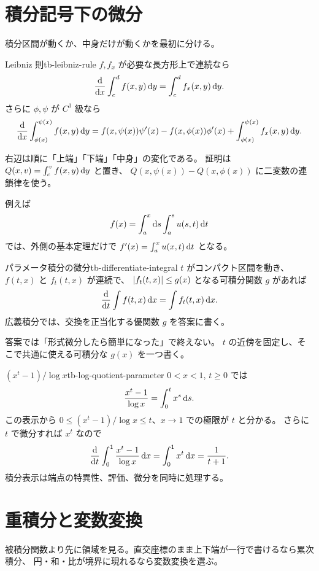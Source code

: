 \section{積分記号下の微分}

積分区間が動くか、中身だけが動くかを最初に分ける。

\begin{theorem}{Leibniz 則}{tb-leibniz-rule}
$f,f_x$ が必要な長方形上で連続なら
\[
\frac{\mathrm{d}}{\mathrm{d} x}\int_c^d f(x,y)\,\mathrm{d} y
=\int_c^d f_x(x,y)\,\mathrm{d} y.
\]
さらに $\phi,\psi$ が $C^1$ 級なら
\[
\frac{\mathrm{d}}{\mathrm{d} x}\int_{\phi(x)}^{\psi(x)}f(x,y)\,\mathrm{d} y
=f(x,\psi(x))\psi'(x)-f(x,\phi(x))\phi'(x)
+\int_{\phi(x)}^{\psi(x)}f_x(x,y)\,\mathrm{d} y.
\]
\end{theorem}

右辺は順に「上端」「下端」「中身」の変化である。
証明は $Q(x,v)=\int_c^v f(x,y)\,\mathrm{d} y$ と置き、
$Q(x,\psi(x))-Q(x,\phi(x))$ に二変数の連鎖律を使う。

例えば
\[
f(x)=\int_a^x\mathrm{d} s\int_a^s u(s,t)\,\mathrm{d} t
\]
では、外側の基本定理だけで
$f'(x)=\int_a^xu(x,t)\,\mathrm{d} t$ となる。

\begin{theorem}{パラメータ積分の微分}{tb-differentiate-integral}
$t$ がコンパクト区間を動き、$f(t,x)$ と $f_t(t,x)$ が連続で、
$\lvert f_t(t,x) \rvert\le g(x)$ となる可積分関数 $g$ があれば
\[
\frac{\mathrm{d}}{\mathrm{d} t}\int f(t,x)\,\mathrm{d} x=\int f_t(t,x)\,\mathrm{d} x.
\]
広義積分では、交換を正当化する優関数 $g$ を答案に書く。
\end{theorem}

答案では「形式微分したら簡単になった」で終えない。
$t$ の近傍を固定し、そこで共通に使える可積分な $g(x)$ を一つ書く。

\begin{example}{$(x^t-1)/\log x$}{tb-log-quotient-parameter}
$0<x<1$, $t\ge0$ では
\[
\frac{x^t-1}{\log x}=\int_0^t x^s\,\mathrm{d} s.
\]
この表示から $0\le (x^t-1)/\log x\le t$、$x\to1$ での極限が $t$ と分かる。
さらに $t$ で微分すれば $x^t$ なので
\[
\frac{\mathrm{d}}{\mathrm{d} t}\int_0^1\frac{x^t-1}{\log x}\,\mathrm{d} x
=\int_0^1x^t\,\mathrm{d} x=\frac1{t+1}.
\]
積分表示は端点の特異性、評価、微分を同時に処理する。
\end{example}

\section{重積分と変数変換}

被積分関数より先に領域を見る。直交座標のまま上下端が一行で書けるなら累次積分、
円・和・比が境界に現れるなら変数変換を選ぶ。

